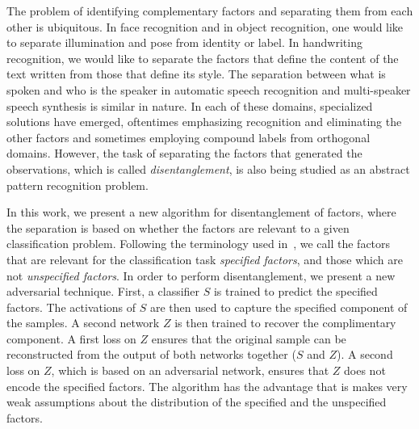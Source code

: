 \documentclass[10pt,twocolumn,letterpaper]{article}
\begin{document}
The problem of identifying complementary factors and separating them from each other is ubiquitous. In face recognition and in object recognition, one would like to separate illumination and pose from identity or label. In handwriting recognition, we would like to separate the factors that define the content of the text written from those that define its style. The separation between what is spoken and who is the speaker in automatic speech recognition and multi-speaker speech synthesis is similar in nature. In each of these domains, specialized solutions have emerged, oftentimes emphasizing recognition and eliminating the other factors and sometimes employing compound labels from orthogonal domains. However, the task of separating the factors that generated the observations, which is called \textit{disentanglement}, is also being studied as an abstract pattern recognition problem.

In this work, we present a new algorithm for disentanglement of factors,  where the separation is based on whether the factors are relevant to a given classification problem. Following the terminology used in~\cite{disentanglement}, we call the factors that are relevant for the classification task \textit{specified factors}, and those which are not \textit{unspecified factors}. %
In order to perform disentanglement, we present a new adversarial technique. First, a classifier $S$ is trained to predict the specified factors. The activations of $S$ are then used to capture the specified component of the samples. A second network $Z$ is then trained to recover the complimentary component. A first loss on $Z$ ensures that the original sample can be reconstructed from the output of both networks together ($S$ and $Z$). A second loss on $Z$, which is based on an adversarial network, ensures that $Z$ does not encode the specified factors. The algorithm has the advantage that is makes very weak assumptions about the distribution of the specified and the unspecified factors. 
\end{document}
